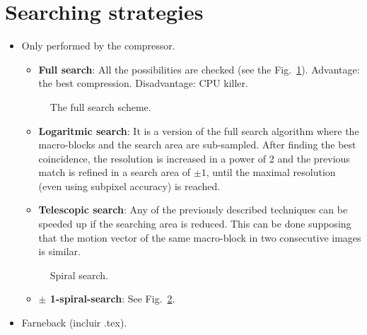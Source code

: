 \section{Searching strategies}
\begin{itemize}
\item
  Only performed by the compressor.

  \begin{itemize} \tightlist \item \textbf{Full search}: All the
  possibilities are checked (see the
  Fig.~\ref{fig:full_search}). Advantage: the best
  compression. Disadvantage: CPU killer.  \end{itemize}

  \begin{figure}
    \caption{The full search scheme.}
    \label{fig:full_search}
  \end{figure}
  
  \begin{itemize}
  \tightlist
  \item
    \textbf{Logaritmic search}: It is a version of the full search algorithm
    where the macro-blocks and the search area are sub-sampled. After
    finding the best coincidence, the resolution is increased in a power
    of 2 and the previous match is refined in a search area of
    $\pm 1$, until the maximal resolution (even using subpixel
    accuracy) is reached.
  \end{itemize}

  \begin{itemize}
  \tightlist
  \item
    \textbf{Telescopic search}: Any of the previously described
    techniques can be speeded up if the searching area is reduced. This
    can be done supposing that the motion vector of the same macro-block
    in two consecutive images is similar.
  \end{itemize}

  \begin{figure}[h]
    \caption{Spiral search.}
    \label{fig:spiral_search}
  \end{figure}

  \begin{itemize}
  \tightlist
  \item
    \textbf{$\pm$ 1-spiral-search}: See Fig.~\ref{fig:spiral_search}.
  \end{itemize}

  \item Farneback (incluir .tex).

\end{itemize}

